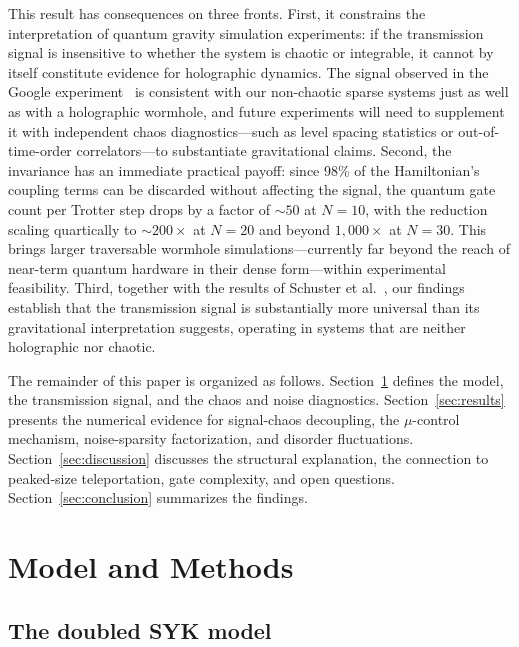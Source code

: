 \documentclass[aps,prd,twocolumn,superscriptaddress,nofootinbib,floatfix]{revtex4-2}
\begin{document}
This result has consequences on three fronts. First, it constrains the
interpretation of quantum gravity simulation experiments: if the
transmission signal is insensitive to whether the system is chaotic or
integrable, it cannot by itself constitute evidence for holographic
dynamics. The signal observed in the Google experiment~\cite{Jafferis:2022uhu}
is consistent with our non-chaotic sparse systems just as well as with a
holographic wormhole, and future experiments will need to supplement it
with independent chaos diagnostics---such as level spacing statistics or
out-of-time-order correlators---to substantiate gravitational claims.
Second, the invariance has an immediate practical payoff: since 98\% of the
Hamiltonian's coupling terms can be discarded without affecting the signal,
the quantum gate count per Trotter step drops by a factor of ${\sim}50$
at $N=10$, with the reduction scaling quartically to ${\sim}200\times$ at
$N=20$ and beyond $1{,}000\times$ at $N=30$. This brings larger traversable
wormhole simulations---currently far beyond the reach of near-term quantum
hardware in their dense form---within experimental feasibility.
Third, together with the results of Schuster et
al.~\cite{Schuster:2021uvg}, our findings establish that the transmission
signal is substantially more universal than its gravitational
interpretation suggests, operating in systems that are neither holographic
nor chaotic.

The remainder of this paper is organized as follows.
Section~\ref{sec:methods} defines the model, the transmission signal, and
the chaos and noise diagnostics. Section~\ref{sec:results} presents the
numerical evidence for signal-chaos decoupling, the $\mu$-control
mechanism, noise-sparsity factorization, and disorder fluctuations.
Section~\ref{sec:discussion} discusses the structural explanation, the
connection to peaked-size teleportation, gate complexity, and open
questions. Section~\ref{sec:conclusion} summarizes the findings.

\section{Model and Methods}
\label{sec:methods}

\subsection{The doubled SYK model}
\label{sec:model}
\end{document}
